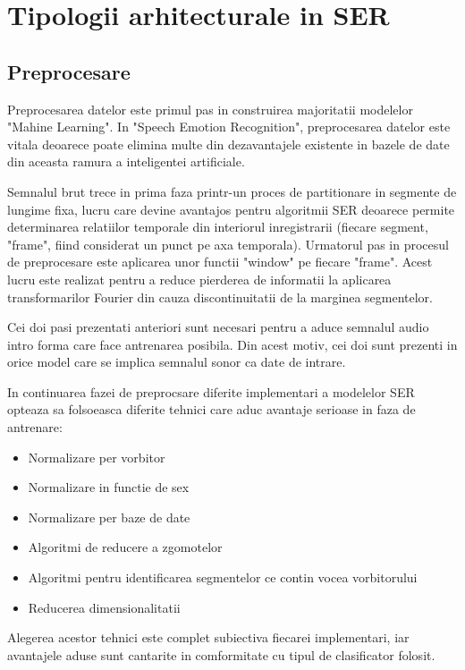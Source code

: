 \documentclass[a4paper,12pt, twoside]{book}
\begin{document}
				\section{Tipologii arhitecturale in SER}
					\subsection{Preprocesare}
						Preprocesarea datelor este primul pas in construirea majoritatii modelelor "Mahine Learning". In "Speech Emotion Recognition", preprocesarea datelor este vitala deoarece poate elimina multe din dezavantajele existente in bazele de date din aceasta ramura a inteligentei artificiale.\par
						Semnalul brut trece in prima faza printr-un proces de partitionare in segmente de lungime fixa, lucru care devine avantajos pentru algoritmii SER deoarece permite determinarea relatiilor temporale din interiorul inregistrarii (fiecare segment, "frame", fiind considerat un punct pe axa temporala). Urmatorul pas in procesul de preprocesare este aplicarea unor functii "window" pe fiecare "frame". Acest lucru este realizat pentru a reduce pierderea de informatii la aplicarea transformarilor Fourier din cauza discontinuitatii de la marginea segmentelor. \par
						Cei doi pasi prezentati anteriori sunt necesari pentru a aduce semnalul audio intro forma care face antrenarea posibila. Din acest motiv, cei doi sunt prezenti in orice model care se implica semnalul sonor ca date de intrare. \par
						In continuarea fazei de preprocsare diferite implementari a modelelor SER opteaza sa folsoeasca diferite tehnici care aduc avantaje serioase in faza de antrenare:
						\begin{itemize}
							\item Normalizare per vorbitor
							\item Normalizare in functie de sex
							\item Normalizare per baze de date
							\item Algoritmi de reducere a zgomotelor
							\item Algoritmi pentru identificarea segmentelor ce contin vocea vorbitorului
							\item Reducerea dimensionalitatii
						\end{itemize}
						Alegerea acestor tehnici este complet subiectiva fiecarei implementari, iar avantajele aduse sunt cantarite in comformitate cu tipul de clasificator folosit.
\end{document}

